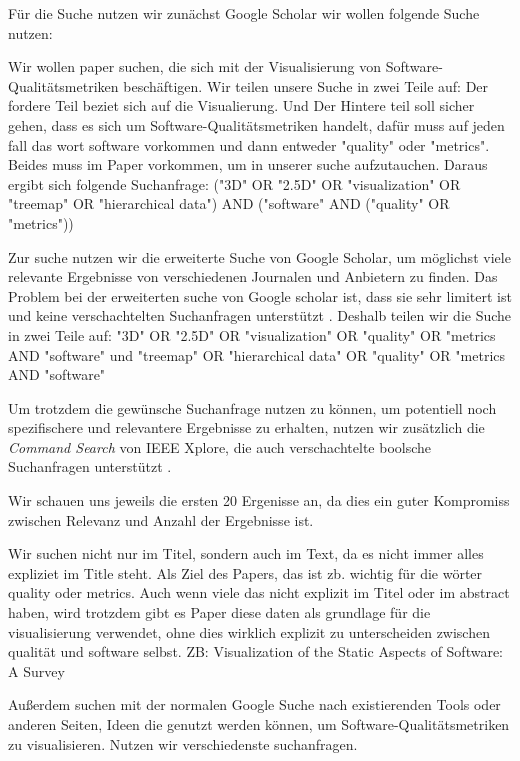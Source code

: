 Für die Suche nutzen wir zunächst Google Scholar wir wollen folgende Suche nutzen:

Wir wollen paper suchen, die sich mit der Visualisierung von Software-Qualitätsmetriken beschäftigen.
Wir teilen unsere Suche in zwei Teile auf:
Der fordere Teil beziet sich auf die Visualierung.
Und 
Der Hintere teil soll sicher gehen, dass es sich um Software-Qualitätsmetriken handelt, dafür muss auf jeden fall das wort software vorkommen und dann entweder "quality" oder "metrics". 
Beides muss im Paper vorkommen, um in unserer suche aufzutauchen.
Daraus ergibt sich folgende Suchanfrage:
("3D" OR "2.5D" OR "visualization" OR "treemap" OR "hierarchical data") AND ("software" AND ("quality" OR "metrics"))

Zur suche nutzen wir die erweiterte Suche von Google Scholar, um möglichst viele relevante Ergebnisse von verschiedenen Journalen und Anbietern zu finden.
Das Problem bei der erweiterten suche von Google scholar ist, dass sie sehr limitert ist und keine verschachtelten Suchanfragen unterstützt \cite{scholar_queries_2023}.
Deshalb teilen wir die Suche in zwei Teile auf: 
"3D" OR "2.5D" OR "visualization" OR "quality" OR "metrics AND "software"
und 
"treemap" OR "hierarchical data" OR "quality" OR "metrics AND "software"

Um trotzdem die gewünsche Suchanfrage nutzen zu können, um potentiell noch spezifischere und relevantere Ergebnisse zu erhalten, nutzen wir zusätzlich die \textit{Command Search} von IEEE Xplore, die auch verschachtelte boolsche Suchanfragen unterstützt \cite{ieee_xplore_boolean_2025}.

Wir schauen uns jeweils die ersten 20 Ergenisse an, da dies ein guter Kompromiss zwischen Relevanz und Anzahl der Ergebnisse ist.

Wir suchen nicht nur im Titel, sondern auch im Text, da es nicht immer alles expliziet im Title steht. 
Als Ziel des Papers, das ist zb. wichtig für die wörter quality oder metrics. Auch wenn viele das nicht explizit im Titel oder im abstract haben, wird trotzdem gibt es Paper diese daten als grundlage für die visualisierung verwendet, ohne dies wirklich explizit zu unterscheiden zwischen qualität und software selbst. ZB: Visualization of the Static Aspects of Software: A Survey

Außerdem suchen mit der normalen Google Suche nach existierenden Tools oder anderen Seiten, Ideen die genutzt werden können, um Software-Qualitätsmetriken zu visualisieren. Nutzen wir verschiedenste suchanfragen.

